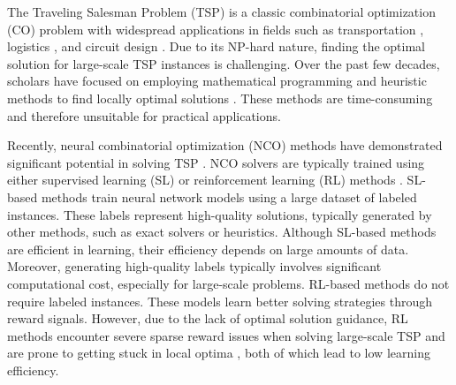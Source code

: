 
The Traveling Salesman Problem (TSP) is a classic combinatorial optimization (CO) problem with widespread applications in fields such as transportation \cite{wang2021deep}, logistics \cite{castaneda2022optimizing}, and circuit design \cite{alkaya2013application}. Due to its NP-hard nature, finding the optimal solution for large-scale TSP instances is challenging. Over the past few decades, scholars have focused on employing mathematical programming and heuristic methods to find locally optimal solutions \cite{applegate2009certification,lin1973effective,helsgaun2000effective}. These methods are time-consuming and therefore unsuitable for practical applications.

Recently, neural combinatorial optimization (NCO) methods have demonstrated significant potential in solving TSP  \cite{kwon2020pomo,jin2023pointerformer,drakulic2024bq}. 
NCO solvers are typically trained using either supervised learning (SL) \cite{joshi2019efficient,hottung2021learning,luo2023neural} or reinforcement learning (RL) methods \cite{bello2016neural,kwon2020pomo,jin2023pointerformer}. 
    SL-based methods train neural network models using a large dataset of labeled instances. These labels represent high-quality solutions, typically generated by other methods, such as exact solvers or heuristics. Although SL-based methods are efficient in learning, their efficiency depends on large amounts of data. Moreover, generating high-quality labels typically involves significant computational cost, especially for large-scale problems. RL-based methods do not require labeled instances. These models learn better solving strategies through reward signals. However, due to the lack of optimal solution guidance, RL methods encounter severe sparse reward issues when solving large-scale TSP and are prone to getting stuck in local optima \cite{bengio2021machine, min2024unsupervised}, both of which lead to low learning efficiency. 

